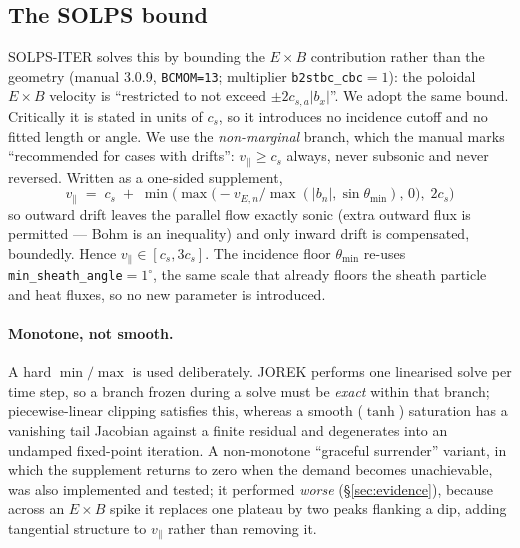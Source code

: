 \documentclass[11pt,a4paper]{article}
\newcommand{\code}[1]{\texttt{\small #1}}
\newcommand{\vpar}{v_\parallel}
\newcommand{\cs}{c_s}
\newcommand{\vEn}{v_{E,n}}
\begin{document}
\subsection{The SOLPS bound}
SOLPS-ITER solves this by bounding the $E\times B$ contribution rather than the geometry
(manual 3.0.9, \code{BCMOM=13}; multiplier \code{b2stbc\_cbc}$=1$):
the poloidal $E\times B$ velocity is ``restricted to not exceed $\pm2c_{s,a}|b_x|$''. We adopt the
same bound. Critically it is stated in units of $\cs$, so it introduces no incidence cutoff and no
fitted length or angle. We use the \emph{non-marginal} branch, which the manual marks
``recommended for cases with drifts'': $\vpar\ge \cs$ always, never subsonic and never reversed.
Written as a one-sided supplement,
\begin{equation}
\boxed{\;\vpar \;=\; \cs \;+\; \min\!\Big(\max\big(-\vEn/\max(|b_n|,\sin\theta_{\min}),\,0\big),\;2\cs\Big)\;}
\label{eq:supp}
\end{equation}
so outward drift leaves the parallel flow exactly sonic (extra outward flux is permitted --- Bohm
is an inequality) and only inward drift is compensated, boundedly. Hence $\vpar\in[\cs,3\cs]$.
The incidence floor $\theta_{\min}$ re-uses \code{min\_sheath\_angle}$=1^\circ$, the same scale
that already floors the sheath particle and heat fluxes, so no new parameter is introduced.

\paragraph{Monotone, not smooth.} A hard $\min/\max$ is used deliberately. JOREK performs one
linearised solve per time step, so a branch frozen during a solve must be \emph{exact} within that
branch; piecewise-linear clipping satisfies this, whereas a smooth ($\tanh$) saturation has a
vanishing tail Jacobian against a finite residual and degenerates into an undamped fixed-point
iteration. A non-monotone ``graceful surrender'' variant, in which the supplement returns to zero
when the demand becomes unachievable, was also implemented and tested; it performed \emph{worse}
(\S\ref{sec:evidence}), because across an $E\times B$ spike it replaces one plateau by two peaks
flanking a dip, adding tangential structure to $\vpar$ rather than removing it.
\end{document}
